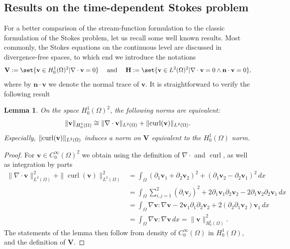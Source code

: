 \documentclass{m2an}
\newcommand{\1}{\mathds{1}}
\newcommand{\vv}{\mathbf{v}}
\newcommand{\Om}{\Omega}
\DeclarePairedDelimiter{\norm}{\lVert}{\rVert}
\newcommand{\na}{\nabla}
\newcommand{\curl}{\operatorname{curl}}
\newcommand{\V}{\mathbf{V}}
\renewcommand{\H}{\mathbf{H}}
\newcommand{\nn}{\mathbf{n}}
\newtheorem{lemma}[theorem]{Lemma}
\theoremstyle{definition}
\begin{document}
    \subsection{Results on the time-dependent Stokes problem}\label{subsec:stokes_theory}

    For a better comparison of the stream-function formulation to the classic formulation of the Stokes problem,
    let us recall some well known results.
    Most commonly, the Stokes equations on the continuous level are discussed in divergence-free spaces,
    to which end we introduce the notations
    \begin{align*}
        \V := \set{\vv \in H^1_0(\Om)^2 | \nabla \cdot \vv = 0}
        \quad \text{ and } \quad 
        \H := \set{\vv \in L^2(\Om)^2| \nabla \cdot \vv = 0 \land \nn\cdot \vv = 0},
    \end{align*}
    where by $\nn \cdot \vv$ we denote the normal trace of $\vv$. It is straightforward to verify the 
    following result
    \begin{lemma}\label{lemm:V_norm_equivalence}
        On the space $H^1_0(\Om)^2$, the following norms are equivalent:
        $$\norm{\vv}_{H^1_0(\Om)} \cong \norm{\na \cdot \vv}_{L^2(\Om)} + \norm{\curl(\vv)}_{L^2(\Om)}.$$
        Especially, $\norm{\curl(\vv)}_{L^2(\Om)}$ induces a norm on $\V$ equivalent to the $H^1_0(\Om)$ norm.
    \end{lemma}
    \begin{proof}
      For $\vv \in C^\infty_0(\Om)^2$ we obtain using the definition of $\nabla \cdot$ and $\curl$, as well as 
      integration by parts
      \begin{align*}
        \|\nabla \cdot \vv\|_{L^2(\Om)}^2 + \|\curl(\vv)\|_{L^2(\Om)}^2
        &= \int_{\Om} (\partial_1 \vv_1 + \partial_2 \vv_2)^2 + (\partial_1 \vv_2 - \partial_2 \vv_1)^2 \, dx\\
        &= \int_\Om \sum_{i,j=1}^2 (\partial_i \vv_j)^2 + 2 \partial_1 \vv_1 \partial_2 \vv_2 - 2 \partial_1 \vv_2 \partial_2 \vv_1 \, dx\\
        &= \int_\Om \nabla \vv : \nabla \vv - 2 \vv_1 \partial_1 \partial_2 \vv_2 + 2 (\partial_2 \partial_1 \vv_2) \vv_1 \, dx\\
        &= \int_\Om \nabla \vv : \nabla \vv \, dx = \|\vv\|_{H^1_0(\Om)}^2.
      \end{align*}
      The statements of the lemma then follow from density of $C^\infty_0(\Om)$ in $H^1_0(\Om)$, and the
      definition of $\V$.
    \end{proof}
    
\end{document}

